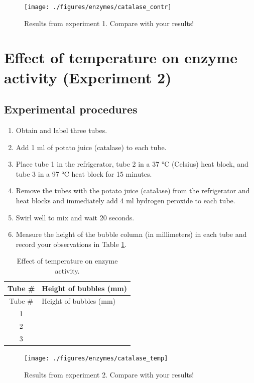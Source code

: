 \begin{figure}

{\centering \texttt{[image: ./figures/enzymes/catalase\_contr]} 

}

\caption{Results from experiment 1. Compare with your results!}\label{fig:contr}
\end{figure}

\section{Effect of temperature on enzyme activity (Experiment
2)}\label{effect-of-temperature-on-enzyme-activity-experiment-2}

\subsection{Experimental procedures}\label{experimental-procedures-21}

\begin{enumerate}
\def\labelenumi{\arabic{enumi}.}
\tightlist
\item
  Obtain and label three tubes.
\item
  Add 1 ml of potato juice (catalase) to each tube.
\item
  Place tube 1 in the refrigerator, tube 2 in a 37 °C (Celsius) heat
  block, and tube 3 in a 97 °C heat block for 15 minutes.
\item
  Remove the tubes with the potato juice (catalase) from the
  refrigerator and heat blocks and immediately add 4 ml hydrogen
  peroxide to each tube.
\item
  Swirl well to mix and wait 20 seconds.
\item
  Measure the height of the bubble column (in millimeters) in each tube
  and record your observations in Table \ref{tab:temp}.
\end{enumerate}

\begin{longtable}[]{@{}cl@{}}
\caption{\label{tab:temp} Effect of temperature on enzyme
activity.}\tabularnewline
\toprule
Tube \# & Height of bubbles (mm)\tabularnewline
\midrule
\endfirsthead
\toprule
Tube \# & Height of bubbles (mm)\tabularnewline
\midrule
\endhead
1 &\tabularnewline
2 &\tabularnewline
3 &\tabularnewline
\bottomrule
\end{longtable}

\begin{figure}

{\centering \texttt{[image: ./figures/enzymes/catalase\_temp]} 

}

\caption{Results from experiment 2. Compare with your results!}\label{fig:temp}
\end{figure}

